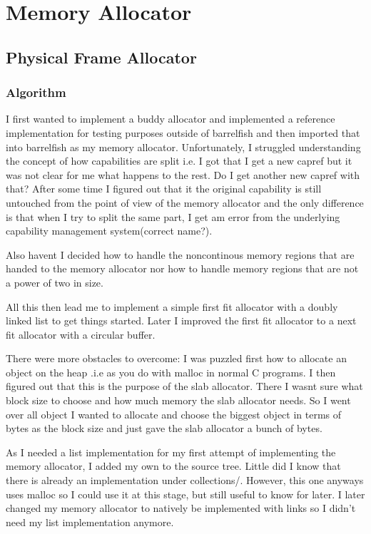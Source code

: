 \chapter{Memory Allocator}

\section{Physical Frame Allocator}

\subsection{Algorithm}

I first wanted to implement a buddy allocator and implemented a reference
implementation for testing purposes outside of barrelfish and then imported that
into barrelfish as my memory allocator. Unfortunately, I struggled understanding
the concept of how capabilities are split i.e. I got that I get a new capref but
it was not clear for me what happens to the rest. Do I get another new capref
with that? After some time I figured out that it the original capability is
still untouched from the point of view of the memory allocator and the only
difference is that when I try to split the same part, I get am error from the
underlying capability management system(correct name?).

Also havent I decided how to handle the noncontinous memory regions that are
handed to the memory allocator nor how to handle memory regions that are not a
power of two in size.

All this then lead me to implement a simple first fit allocator with a doubly
linked list to get things started. Later I improved the first fit allocator to a
next fit allocator with a circular buffer.

There were more obstacles to overcome: I was puzzled first how to allocate an
object on the heap .i.e as you do with malloc in normal C programs. I then
figured out that this is the purpose of the slab allocator. There I wasnt sure
what block size to choose and how much memory the slab allocator needs. So I
went over all object I wanted to allocate and choose the biggest object in terms
of bytes as the block size and just gave the slab allocator a bunch of bytes.

As I needed a list implementation for my first attempt of implementing the
memory allocator, I added my own to the source tree. Little did I know that
there is already an implementation under collections/. However, this one anyways
uses malloc so I could use it at this stage, but still useful to know for later.
I later changed my memory allocator to natively be implemented with links so I
didn't need my list implementation anymore.

